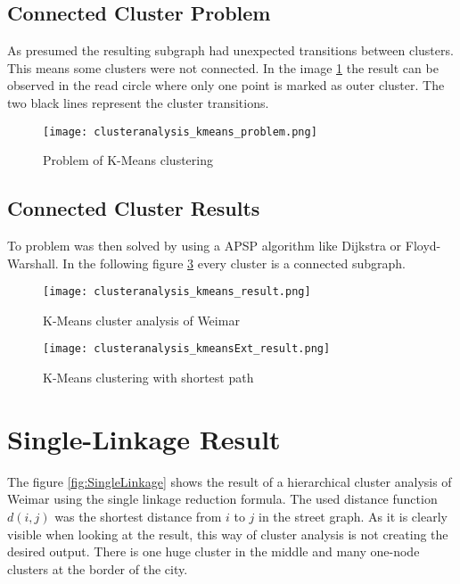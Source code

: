 \subsection{Connected Cluster Problem}
As presumed the resulting subgraph had unexpected transitions between clusters. This means some clusters were not connected. In the image \ref{fig:KmeansProblem} the result can be observed in the read circle where only one point is marked as outer cluster. The two black lines represent the cluster transitions.

\begin{figure}[!ht]
    \centering
    \begin{mdframed}[style=mdthight, userdefinedwidth=0.55\textwidth, align=center]
        \texttt{[image: clusteranalysis\_kmeans\_problem.png]}
    \end{mdframed}
    \caption{Problem of K-Means clustering
        \label{fig:KmeansProblem}}
\end{figure}

\subsection{Connected Cluster Results} \label{sec:K-Means_shortest_path}
To problem was then solved by using a \gls{APSP} algorithm like Dijkstra or Floyd-Warshall. In the following figure \ref{fig:Kmeansshortestp} every cluster is a connected subgraph.

\begin{figure}
    \centering
    \begin{mdframed}[style=mdthight]
        \texttt{[image: clusteranalysis\_kmeans\_result.png]}
    \end{mdframed}
    \caption{K-Means cluster analysis of Weimar \label{fig:KmeansGenerated}}
\end{figure}

\begin{figure}
    \centering
    \begin{mdframed}[style=mdthight]
        \texttt{[image: clusteranalysis\_kmeansExt\_result.png]}
    \end{mdframed}
    \caption{K-Means clustering with shortest path\label{fig:Kmeansshortestp}}
\end{figure}

\pagebreak
\section{Single-Linkage Result}
The figure \ref{fig:SingleLinkage} shows the result of a hierarchical cluster analysis of Weimar using the single linkage reduction formula. The used distance function $d(i, j)$ was the shortest distance from $i$ to $j$ in the street graph. As it is clearly visible when looking at the result, this way of cluster analysis is not creating the desired output. There is one huge cluster in the middle and many one-node clusters at the border of the city.

